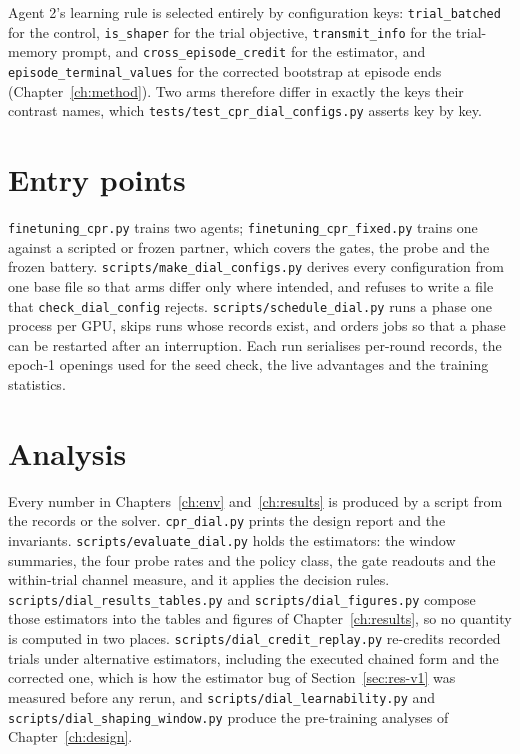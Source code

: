 Agent 2's learning rule is selected entirely by configuration keys:
\texttt{trial\_batched} for the control, \texttt{is\_shaper} for the trial
objective, \texttt{transmit\_info} for the trial-memory prompt, and
\texttt{cross\_episode\_credit} for the estimator, and
\texttt{episode\_terminal\_values} for the corrected bootstrap at episode
ends (Chapter~\ref{ch:method}).
Two arms therefore differ in exactly the keys their contrast names, which
\texttt{tests/test\_cpr\_dial\_configs.py} asserts key by key.

\section{Entry points}
\label{sec:impl-entry}

\texttt{finetuning\_cpr.py} trains two agents; \texttt{finetuning\_cpr\_fixed.py}
trains one against a scripted or frozen partner, which covers the gates, the
probe and the frozen battery.
\texttt{scripts/make\_dial\_configs.py} derives every configuration from one
base file so that arms differ only where intended, and refuses to write a
file that \texttt{check\_dial\_config} rejects.
\texttt{scripts/schedule\_dial.py} runs a phase one process per GPU, skips
runs whose records exist, and orders jobs so that a phase can be restarted
after an interruption.
Each run serialises per-round records, the epoch-1 openings used for the
seed check, the live advantages and the training statistics.

\section{Analysis}
\label{sec:impl-analysis}

Every number in Chapters~\ref{ch:env} and~\ref{ch:results} is produced by a
script from the records or the solver.
\texttt{cpr\_dial.py} prints the design report and the invariants.
\texttt{scripts/evaluate\_dial.py} holds the estimators: the window
summaries, the four probe rates and the policy class, the gate readouts and
the within-trial channel measure, and it applies the decision rules.
\texttt{scripts/dial\_results\_tables.py} and
\texttt{scripts/dial\_figures.py} compose those estimators into the tables
and figures of Chapter~\ref{ch:results}, so no quantity is computed in two
places.
\texttt{scripts/dial\_credit\_replay.py} re-credits recorded trials under
alternative estimators, including the executed chained form and the
corrected one, which is how the estimator bug of Section~\ref{sec:res-v1}
was measured before any rerun, and \texttt{scripts/dial\_learnability.py} and
\texttt{scripts/dial\_shaping\_window.py} produce the pre-training analyses
of Chapter~\ref{ch:design}.

